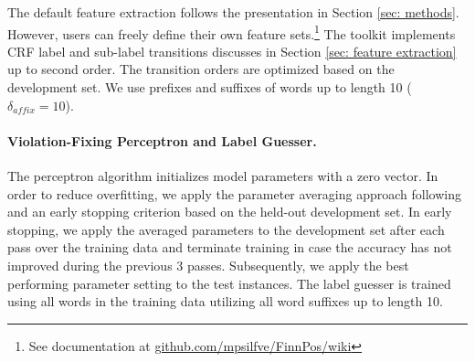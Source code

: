 \documentclass[smallextended]{svjour3}       %
\begin{document}
The default feature extraction follows the presentation in Section
\ref{sec: methods}. However, users can freely define their own
feature sets.\footnote{See documentation at \url{github.com/mpsilfve/FinnPos/wiki}} The
toolkit implements CRF label and sub-label transitions discusses in Section \ref{sec: feature extraction} up to second order. The transition
orders are optimized based on the development set. We use prefixes and suffixes of words up to length 10 ($\delta_{affix} = 10$).



\paragraph{Violation-Fixing Perceptron and Label Guesser.}

The perceptron algorithm initializes model parameters with a zero vector. In order to reduce overfitting, we apply the parameter averaging approach following \citet{collins2002} and an early stopping criterion based on the held-out development set. In early stopping, we apply the averaged parameters to the development set after each pass over the training data and terminate training in case the accuracy has not improved during the previous 3 passes. Subsequently, we apply the best performing parameter setting to the test instances. The label guesser is trained using all words in the training data utilizing all word suffixes up to length 10. 



\end{document}
